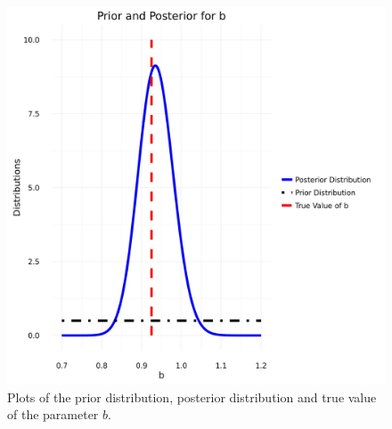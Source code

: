 \documentclass[12pt]{book}
\newcommand{\post}{\mathbb{P}_{post}}
\newcommand{\like}{\mathbb{P}_{like}}
\begin{document}
%
%
%
\begin{figure}[H]
\centering
\includegraphics[scale=0.6]{./FigChap3/prior_posterior.jpg}
\caption{Plots of the prior distribution, posterior distribution and true value of the parameter $b$.}
\label{figlikeprior}
\end{figure} 
\end{document}
